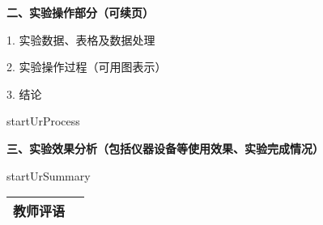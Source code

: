 \documentclass[12px]{article}
\newcommand{\Xtext}{}
\begin{document}
    \newpage
    \fancypage{\fbox}{}
    \textbf{二、实验操作部分（可续页）}

        1. 实验数据、表格及数据处理

        2. 实验操作过程（可用图表示）

        3. 结论

        startUrProcess



    \newpage
    \fancypage{\fbox}{}
    \textbf{三、实验效果分析（包括仪器设备等使用效果、实验完成情况）}

    \Xtext
    startUrSummary
    \newpage
    \fancypage{}{}
    \begin{center}
        \begin{tabular}{|m{1em}|m{15.5cm}|}
            \hline
            教师评语 & \rule{0em}{21cm} \\
            \hline
        \end{tabular}
    \end{center}
\end{document}
